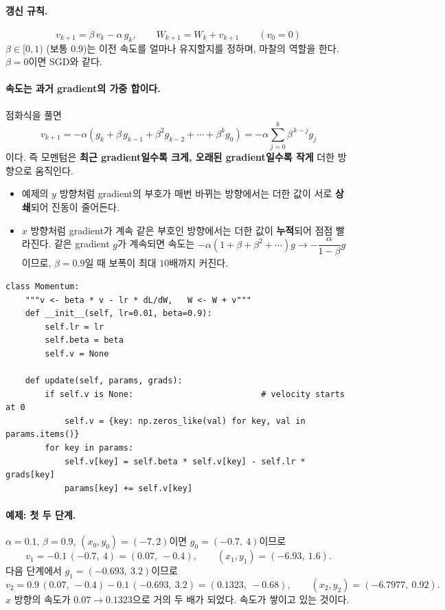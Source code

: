 \documentclass[11pt,a4paper]{article}
\begin{document}
\paragraph{갱신 규칙.}
\[
\boxed{
v_{k+1}=\beta\,v_k-\alpha\,g_k,
\qquad
W_{k+1}=W_k+v_{k+1}
}
\qquad(v_0=0)
\]
$\beta\in[0,1)$ (보통 $0.9$)는 이전 속도를 얼마나 유지할지를 정하며, 마찰의 역할을 한다.
$\beta=0$이면 SGD와 같다.

\paragraph{속도는 과거 gradient의 가중 합이다.}
점화식을 풀면
\[
v_{k+1}=-\alpha\left(g_k+\beta\,g_{k-1}+\beta^2g_{k-2}+\cdots+\beta^k g_0\right)
=-\alpha\sum_{j=0}^{k}\beta^{\,k-j}g_j
\]
이다. 즉 모멘텀은 \textbf{최근 gradient일수록 크게, 오래된 gradient일수록 작게} 더한 방향으로 움직인다.
\begin{itemize}[leftmargin=1.8em]
\item 예제의 $y$ 방향처럼 gradient의 부호가 매번 바뀌는 방향에서는 더한 값이 서로 \textbf{상쇄}되어 진동이 줄어든다.
\item $x$ 방향처럼 gradient가 계속 같은 부호인 방향에서는 더한 값이 \textbf{누적}되어 점점 빨라진다.
같은 gradient $g$가 계속되면 속도는 $-\alpha(1+\beta+\beta^2+\cdots)g\to-\dfrac{\alpha}{1-\beta}g$이므로,
$\beta=0.9$일 때 보폭이 최대 $10$배까지 커진다.
\end{itemize}

\begin{lstlisting}
class Momentum:
    """v <- beta * v - lr * dL/dW,   W <- W + v"""
    def __init__(self, lr=0.01, beta=0.9):
        self.lr = lr
        self.beta = beta
        self.v = None

    def update(self, params, grads):
        if self.v is None:                          # velocity starts at 0
            self.v = {key: np.zeros_like(val) for key, val in params.items()}
        for key in params:
            self.v[key] = self.beta * self.v[key] - self.lr * grads[key]
            params[key] += self.v[key]
\end{lstlisting}

\paragraph{예제: 첫 두 단계.}
$\alpha=0.1$, $\beta=0.9$, $(x_0,y_0)=(-7,2)$이면 $g_0=(-0.7,\ 4)$이므로
\[
v_1=-0.1\,(-0.7,\ 4)=(0.07,\ -0.4),
\qquad
(x_1,y_1)=(-6.93,\ 1.6).
\]
다음 단계에서 $g_1=(-0.693,\ 3.2)$이므로
\[
v_2=0.9\,(0.07,\ -0.4)-0.1\,(-0.693,\ 3.2)=(0.1323,\ -0.68),
\qquad
(x_2,y_2)=(-6.7977,\ 0.92).
\]
$x$ 방향의 속도가 $0.07\to0.1323$으로 거의 두 배가 되었다. 속도가 쌓이고 있는 것이다.
\end{document}
